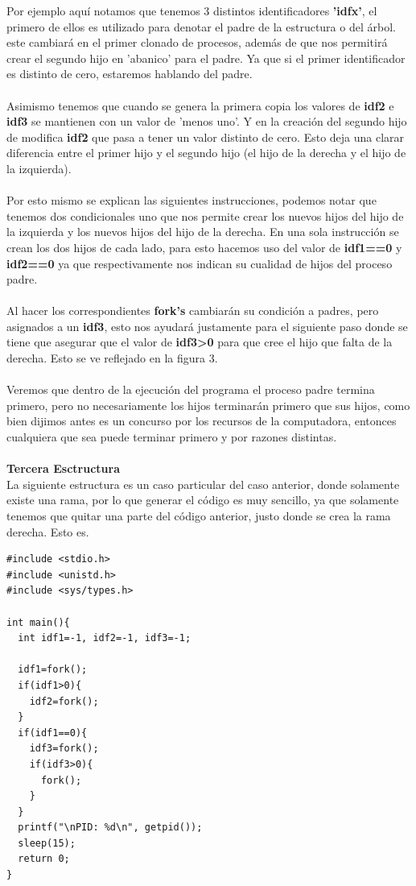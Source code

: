 \documentclass[11pt]{article}
\begin{document}
Por ejemplo aquí notamos que tenemos 3 distintos identificadores \textbf{'idfx'}, el primero de ellos es utilizado para denotar el padre de la estructura o del árbol. este cambiará en el primer clonado de procesos, además de que nos permitirá crear el segundo hijo en 'abanico' para el padre. Ya que si el primer identificador es distinto de cero, estaremos hablando del padre. 
\\\\
Asimismo tenemos que cuando se genera la primera copia los valores de \textbf{idf2} e \textbf{idf3} se mantienen con un valor de 'menos uno'. Y en la creación del segundo hijo de modifica \textbf{idf2} que pasa a tener un valor distinto de cero. Esto deja una clarar diferencia entre el primer hijo y el segundo hijo (el hijo de la derecha y el hijo de la izquierda). 
\\\\
Por esto mismo se explican las siguientes instrucciones, podemos notar que tenemos dos condicionales uno que nos permite crear los nuevos hijos del hijo de la izquierda y los nuevos hijos del hijo de la derecha. En una sola instrucción se crean los dos hijos de cada lado, para esto hacemos uso del valor de \textbf{idf1==0} y \textbf{idf2==0} ya que respectivamente nos indican su cualidad de hijos del proceso padre. 
\\\\
Al hacer los correspondientes \textbf{fork's} cambiarán su condición a padres, pero asignados a un \textbf{idf3}, esto nos ayudará justamente para el siguiente paso donde se tiene que asegurar que el valor de \textbf{idf3>0} para que cree el hijo que falta de la derecha. Esto se ve reflejado en la figura 3. 
\\\\
Veremos que dentro de la ejecución del programa el proceso padre termina primero, pero no necesariamente los hijos terminarán primero que sus hijos, como bien dijimos antes es un concurso por los recursos de la computadora, entonces cualquiera que sea puede terminar primero y por razones distintas.
\\\\
\textbf{Tercera Esctructura}
\\
La siguiente estructura es un caso particular del caso anterior, donde solamente existe una rama, por lo que generar el código es muy sencillo, ya que solamente tenemos que quitar una parte del código anterior, justo donde se crea la rama derecha. Esto es. 
\begin{lstlisting}
#include <stdio.h>
#include <unistd.h>
#include <sys/types.h>

int main(){
  int idf1=-1, idf2=-1, idf3=-1;

  idf1=fork();
  if(idf1>0){
    idf2=fork();
  }
  if(idf1==0){
    idf3=fork();
    if(idf3>0){
      fork();
    }
  }
  printf("\nPID: %d\n", getpid());
  sleep(15);
  return 0;
}
\end{lstlisting}
\end{document}
